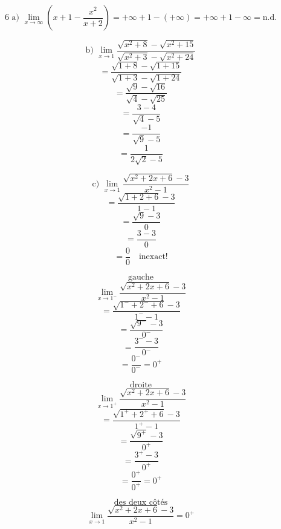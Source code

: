 \documentclass{article}
\begin{document}
\[
\text{6 a) } \lim_{x \to \infty} \left( x+1 - \frac{x^2}{x+2} \right) = +\infty+1 - (+\infty) = +\infty+1-\infty = \text{n.d.}
\]

\[
\text{b) } \lim_{x \to 1} \frac{\sqrt{x^2+8} - \sqrt{x^2+15}}{\sqrt{x^2+3} - \sqrt{x^2+24}}
\]
\[
= \frac{\sqrt{1+8} - \sqrt{1+15}}{\sqrt{1+3} - \sqrt{1+24}}
\]
\[
= \frac{\sqrt{9} - \sqrt{16}}{\sqrt{4} - \sqrt{25}}
\]
\[
= \frac{3 - 4}{\sqrt{4} - 5}
\]
\[
= \frac{-1}{\sqrt{9}-5}
\]
\[
= \frac{1}{2\sqrt{2}-5}
\]

\[
\text{c) } \lim_{x \to 1} \frac{\sqrt{x^2+2x+6} - 3}{x^2-1}
\]
\[
= \frac{\sqrt{1+2+6} - 3}{1-1}
\]
\[
= \frac{\sqrt{9} - 3}{0}
\]
\[
= \frac{3 - 3}{0}
\]
\[
= \frac{0}{0} \quad \text{inexact!}
\]

\[
\text{gauche}
\]
\[
\lim_{x \to 1^-} \frac{\sqrt{x^2+2x+6} - 3}{x^2-1}
\]
\[
= \frac{\sqrt{1^-+2^-+6} - 3}{1^--1}
\]
\[
= \frac{\sqrt{9^-} - 3}{0^-}
\]
\[
= \frac{3^- - 3}{0^-}
\]
\[
= \frac{0^-}{0^-} = 0^+
\]

\[
\text{droite}
\]
\[
\lim_{x \to 1^+} \frac{\sqrt{x^2+2x+6} - 3}{x^2-1}
\]
\[
= \frac{\sqrt{1^++2^++6} - 3}{1^+-1}
\]
\[
= \frac{\sqrt{9^+} - 3}{0^+} 
\]
\[
= \frac{3^+ - 3}{0^+}
\]
\[
= \frac{0^+}{0^+} = 0^+
\]

\[
\text{des deux côtés}
\]
\[
\lim_{x \to 1} \frac{\sqrt{x^2+2x+6} - 3}{x^2-1} = 0^+
\]
\end{document}
